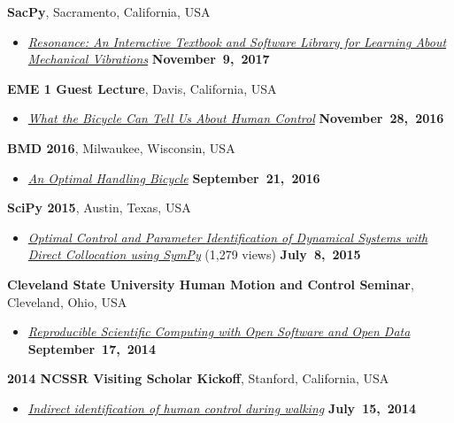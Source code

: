 \documentclass[10pt]{article}
\newenvironment{outerlist}[1][\enskip\textbullet]%
        {\begin{itemize}[#1]}{\end{itemize}%
         \vspace{-.6\baselineskip}}
\newcommand{\blankline}{\quad\pagebreak[2]}
\begin{document}
\blankline

\textbf{SacPy}, Sacramento, California, USA
\begin{outerlist}
\item[]
  \href{https://www.slideshare.net/moorepants/resonance-introduction-at-sacpy/1}{\textit{Resonance:
      An Interactive Textbook and Software Library for Learning About
      Mechanical Vibrations}}
    \hfill \textbf{November~9,~2017}
\end{outerlist}

\blankline

\textbf{EME 1 Guest Lecture}, Davis, California, USA
\begin{outerlist}
\item[]
  \href{http://www.moorepants.info/presentations/2016/EME001/#/}{\textit{What
    the Bicycle Can Tell Us About Human Control}}
    \hfill \textbf{November~28,~2016}
\end{outerlist}

\blankline

\textbf{BMD 2016}, Milwaukee, Wisconsin, USA
\begin{outerlist}
\item[]
  \href{http://www.moorepants.info/presentations/2016/BMD2016/}{\textit{
    An Optimal Handling Bicycle}}
    \hfill \textbf{September~21,~2016}
\end{outerlist}

\blankline

\textbf{SciPy 2015}, Austin, Texas, USA
\begin{outerlist}
\item[]
  \href{https://youtu.be/ZJiYs2HuQy8}{\textit{
    Optimal Control and Parameter Identification of Dynamical Systems with
Direct Collocation using SymPy}} (1,279 views)
    \hfill \textbf{July~8,~2015}
\end{outerlist}

\blankline

\textbf{Cleveland State University Human Motion and Control Seminar}, Cleveland, Ohio, USA
\begin{outerlist}
\item[]
  \href{http://www.moorepants.info/presentations/2014/csu-fall-hmc-seminar}{\textit{Reproducible
    Scientific Computing with Open Software and Open Data}}
    \hfill \textbf{September~17,~2014}
\end{outerlist}

\blankline

\textbf{2014 NCSSR Visiting Scholar Kickoff}, Stanford, California, USA
\begin{outerlist}
\item[]
  \href{http://www.moorepants.info/presentations/2014/ncssr-kickoff}{\textit{Indirect
      identification of human control during walking}}
    \hfill \textbf{July~15,~2014}
\end{outerlist}
\end{document}

